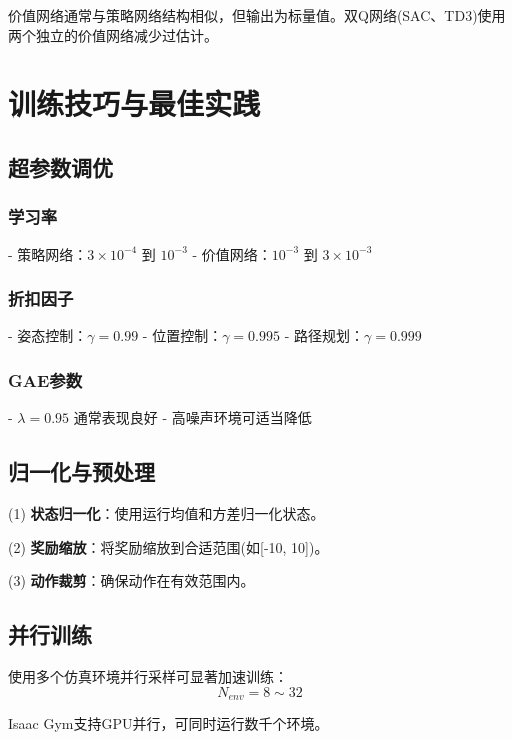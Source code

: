 价值网络通常与策略网络结构相似，但输出为标量值。双Q网络(SAC、TD3)使用两个独立的价值网络减少过估计。

\section{训练技巧与最佳实践}\label{sec:training_tips}

\subsection{超参数调优}

\subsubsection{学习率}

- 策略网络：$3\times10^{-4}$ 到 $10^{-3}$
- 价值网络：$10^{-3}$ 到 $3\times10^{-3}$

\subsubsection{折扣因子}

- 姿态控制：$\gamma = 0.99$
- 位置控制：$\gamma = 0.995$
- 路径规划：$\gamma = 0.999$

\subsubsection{GAE参数}

- $\lambda = 0.95$ 通常表现良好
- 高噪声环境可适当降低

\subsection{归一化与预处理}

(1) \textbf{状态归一化}：使用运行均值和方差归一化状态。

(2) \textbf{奖励缩放}：将奖励缩放到合适范围(如[-10, 10])。

(3) \textbf{动作裁剪}：确保动作在有效范围内。

\subsection{并行训练}

使用多个仿真环境并行采样可显著加速训练：
\begin{equation}
N_{env} = 8 \sim 32
\end{equation}

Isaac Gym支持GPU并行，可同时运行数千个环境。

